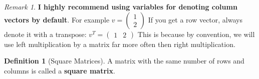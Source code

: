 \documentclass[12pt, a4paper]{article}
\theoremstyle{remark}
\newtheorem{remark}{Remark}
\theoremstyle{definition}
\newtheorem{definition}{Definition}
\numberwithin{equation}{section}
\numberwithin{definition}{section}
\numberwithin{example}{section}
\numberwithin{exercise}{section}
\numberwithin{remark}{section}
\numberwithin{figure}{section}
\begin{document}
\begin{remark}
    \label{rmk: Column Vector}
    \textbf{I highly recommend using variables for denoting column vectors by default}.
    For example $v = 
    \begin{pmatrix}
        1 \\ 2
    \end{pmatrix}
    $
    If you get a row vector, always denote it with a transpose: $ v^T =
    \begin{pmatrix}
        1 & 2
    \end{pmatrix}
    $
    This is because by convention, we will use left multiplication by a matrix far more often then right multiplication.
\end{remark}
\begin{definition}[Square Matrices]
    A matrix with the same number of rows and columns is called a \textbf{square matrix}.
\end{definition}
\end{document}

